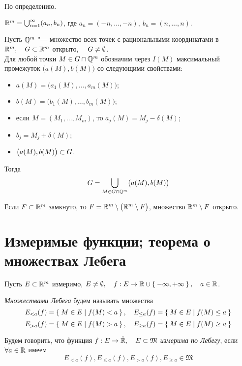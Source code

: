 \begin{eproof}
	\item По определению.

	\item $ \mathbb{R}^m = \bigcup_{n = 1}^\infty (a_n, b_n) $, где $ a_n = (-n, \dots, -n), ~ b_n = (n, \dots, n) $.

	\item Пусть $ \mathbb{Q}^m $ "--- множество всех точек с рациональными координатами в $ \mathbb{R}^m, \quad G \subset \mathbb{R}^m $ открыто, $ \quad G \ne \emptyset $. \\
		Для любой точки $ M \in G \cap \mathbb{Q}^m $ обозначим через $ I(M) $ максимальный промежуток $ \bigl( a(M), b(M) \bigr) $ со следующими свойствами:
		\begin{itemize}
			\item $ a(M) = \bigl( a_1(M), \dots, a_m(M) \bigr) $;
			\item $ b(M) = \bigl( b_1(M), \dots, b_m(M) \bigr) $;
			\item если $ M = (M_1, \dots, M_m) $, то $ a_j(M) = M_j - \delta(M) $;
			\item $ b_j = M_j + \delta(M) $;
			\item $ \bigl( a(M), b(M) \bigr) \subset G $.
		\end{itemize}
		Тогда
		$$ G = \bigcup_{M \in G \cap \mathbb{Q}^m} \bigl( a(M), b(M) \bigr) $$

	\item Если $ F \subset \mathbb{R}^m $ замкнуто, то $ F = \mathbb{R}^m \setminus \bigl( \mathbb{R}^m \setminus F \bigr) $, множество $ \mathbb{R}^m \setminus F $ открыто.
\end{eproof}

\section{Измеримые функции; теорема о множествах Лебега}

\begin{definition}
	Пусть $ E \subset \mathbb{R}^m $ измеримо, $ E \ne \emptyset, \quad f : E \to \mathbb{R} \cup \Set{-\infty, +\infty}, \quad a \in \mathbb{R} $.

	\emph{Множествами Лебега} будем называть множества
	$$ E_{<a}(f) = \Set{M \in E \mid f(M) < a}, \quad E_{\le a}(f) = \Set{M \in E \mid f(M) \le a} $$
	$$ E_{>a}(f) = \Set{M \in E \mid f(M) > a}, \quad E_{\ge a}(f) = \Set{M \in E \mid f(M) \ge a} $$
\end{definition}

\begin{definition}
	Будем говорить, что функция $ f : E \to \hat{\mathbb{R}}, \quad E \subset \mathfrak M $ \emph{измерима по Лебегу}, если $ \forall a \in \mathbb{R} $ имеем
	$$ E_{<a}(f), E_{\le a}(f), E_{>a}(f), E_{\ge a} \in \mathfrak M $$
\end{definition}


